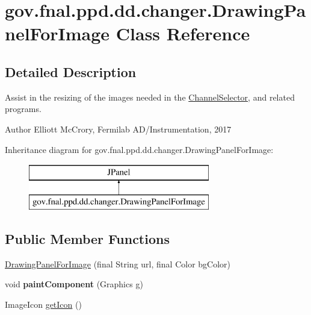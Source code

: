 \hypertarget{classgov_1_1fnal_1_1ppd_1_1dd_1_1changer_1_1DrawingPanelForImage}{\section{gov.\-fnal.\-ppd.\-dd.\-changer.\-Drawing\-Panel\-For\-Image Class Reference}
\label{classgov_1_1fnal_1_1ppd_1_1dd_1_1changer_1_1DrawingPanelForImage}
}


\subsection{Detailed Description}
Assist in the resizing of the images needed in the \hyperlink{classgov_1_1fnal_1_1ppd_1_1dd_1_1ChannelSelector}{Channel\-Selector}, and related programs.

\begin{DoxyAuthor}{Author}
Elliott Mc\-Crory, Fermilab A\-D/\-Instrumentation, 2017 
\end{DoxyAuthor}
Inheritance diagram for gov.\-fnal.\-ppd.\-dd.\-changer.\-Drawing\-Panel\-For\-Image\-:\begin{figure}[H]
\begin{center}
\leavevmode
\includegraphics[height=2.000000cm]{classgov_1_1fnal_1_1ppd_1_1dd_1_1changer_1_1DrawingPanelForImage}
\end{center}
\end{figure}
\subsection*{Public Member Functions}
\begin{DoxyCompactItemize}
\item 
\hyperlink{classgov_1_1fnal_1_1ppd_1_1dd_1_1changer_1_1DrawingPanelForImage_a744ff322c9e8fe0decb1ac2bc61e18a5}{Drawing\-Panel\-For\-Image} (final String url, final Color bg\-Color)
\item 
\hypertarget{classgov_1_1fnal_1_1ppd_1_1dd_1_1changer_1_1DrawingPanelForImage_a54d6ead6292aeea4b6ba3db069e3c23d}{void {\bfseries paint\-Component} (Graphics g)}\label{classgov_1_1fnal_1_1ppd_1_1dd_1_1changer_1_1DrawingPanelForImage_a54d6ead6292aeea4b6ba3db069e3c23d}

\item 
Image\-Icon \hyperlink{classgov_1_1fnal_1_1ppd_1_1dd_1_1changer_1_1DrawingPanelForImage_a938a2167687485031b3a4ab35eedeebe}{get\-Icon} ()
\end{DoxyCompactItemize}


